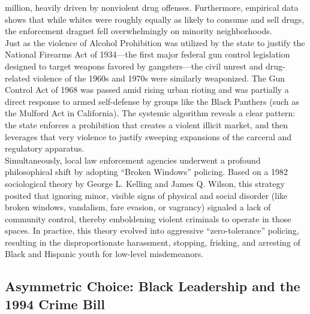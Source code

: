 \documentclass[
]{article}
\begin{document}
million, heavily driven by nonviolent drug offenses. Furthermore,
empirical data shows that while whites were roughly equally as likely to
consume and sell drugs, the enforcement dragnet fell overwhelmingly on
minority neighborhoods.\\
Just as the violence of Alcohol Prohibition was utilized by the state to
justify the National Firearms Act of 1934---the first major federal gun
control legislation designed to target weapons favored by
gangsters---the civil unrest and drug-related violence of the 1960s and
1970s were similarly weaponized. The Gun Control Act of 1968 was passed
amid rising urban rioting and was partially a direct response to armed
self-defense by groups like the Black Panthers (such as the Mulford Act
in California). The systemic algorithm reveals a clear pattern: the
state enforces a prohibition that creates a violent illicit market, and
then leverages that very violence to justify sweeping expansions of the
carceral and regulatory apparatus.\\
Simultaneously, local law enforcement agencies underwent a profound
philosophical shift by adopting ``Broken Windows'' policing. Based on a
1982 sociological theory by George L. Kelling and James Q. Wilson, this
strategy posited that ignoring minor, visible signs of physical and
social disorder (like broken windows, vandalism, fare evasion, or
vagrancy) signaled a lack of community control, thereby emboldening
violent criminals to operate in those spaces. In practice, this theory
evolved into aggressive ``zero-tolerance'' policing, resulting in the
disproportionate harassment, stopping, frisking, and arresting of Black
and Hispanic youth for low-level misdemeanors.

\subsection{\texorpdfstring{\textbf{Asymmetric Choice: Black Leadership
and the 1994 Crime
Bill}}{Asymmetric Choice: Black Leadership and the 1994 Crime Bill}}\label{asymmetric-choice-black-leadership-and-the-1994-crime-bill}
\end{document}
